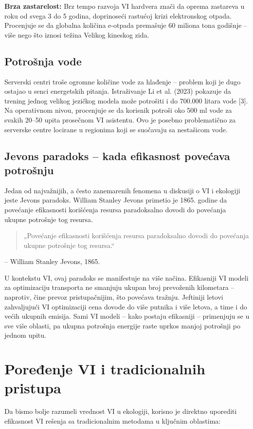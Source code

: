 \documentclass[12pt,a4paper]{article}
\begin{document}
\textbf{Brza zastarelost:} Brz tempo razvoja VI hardvera znači da oprema zastareva u roku od svega 3 do 5 godina, doprinoseći rastućoj krizi elektronskog otpada. Procenjuje se da globalna količina e-otpada premašuje 60 miliona tona godišnje -- više nego što iznosi težina Velikog kineskog zida.

\subsection{Potrošnja vode}
Serverski centri troše ogromne količine vode za hlađenje -- problem koji je dugo ostajao u senci energetskih pitanja. Istraživanje Li et al. (2023) pokazuje da trening jednog velikog jezičkog modela može potrošiti i do 700.000 litara vode [3]. Na operativnom nivou, procenjuje se da korisnik potroši oko 500 ml vode za svakih 20--50 upita prosečnom VI asistentu. Ovo je posebno problematično za serverske centre locirane u regionima koji se suočavaju sa nestašicom vode.

\subsection{Jevons paradoks -- kada efikasnost povećava potrošnju}
Jedan od najvažnijih, a često zanemarenih fenomena u diskusiji o VI i ekologiji jeste Jevons paradoks. William Stanley Jevons primetio je 1865. godine da povećanje efikasnosti korišćenja resursa paradoksalno dovodi do povećanja ukupne potrošnje tog resursa.

\begin{quote}
„Povećanje efikasnosti korišćenja resursa paradoksalno dovodi do povećanja ukupne potrošnje tog resursa.``
\end{quote}
\hfill -- William Stanley Jevons, 1865.

U kontekstu VI, ovaj paradoks se manifestuje na više načina. Efikasniji VI modeli za optimizaciju transporta ne smanjuju ukupan broj prevoženih kilometara -- naprotiv, čine prevoz pristupačnijim, što povećava tražnju. Jeftiniji letovi zahvaljujući VI optimizaciji cena dovode do više putnika i više letova, a time i do većih ukupnih emisija. Sami VI modeli -- kako postaju efikasniji -- primenjuju se u sve više oblasti, pa ukupna potrošnja energije raste uprkos manjoj potrošnji po jednom upitu.

\section{Poređenje VI i tradicionalnih pristupa}
Da bismo bolje razumeli vrednost VI u ekologiji, korisno je direktno uporediti efikasnost VI rešenja sa tradicionalnim metodama u ključnim oblastima:
\end{document}
